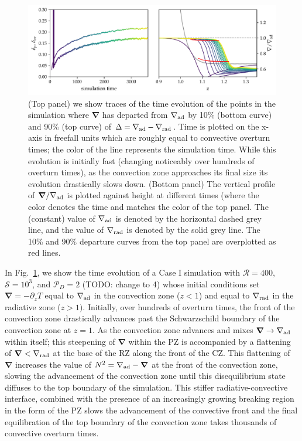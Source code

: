 \documentclass{aastex631}
\newcommand{\gradrad}{\ensuremath{\nabla_{\rm{rad}}}}
\newcommand{\gradad}{\ensuremath{\nabla_{\rm{ad}}}}
\newcommand{\mP}{\ensuremath{\mathcal{P}}}
\newcommand{\mR}{\ensuremath{\mathcal{R}}}
\newcommand{\mS}{\ensuremath{\mathcal{S}}}
\renewcommand{\vec}[1]{\boldsymbol{#1}}
\newcommand{\grad}{\vec{\nabla}}
\begin{document}
\begin{figure}[t!]
\centering
\includegraphics[width=\textwidth]{time_evolution.pdf}
\caption{(Top panel) we show traces of the time evolution of the points in the simulation where $\grad$ has departed from $\gradad$ by 10\% (bottom curve) and 90\% (top curve) of $\Delta = \gradad - \gradrad$.
Time is plotted on the x-axis in freefall units which are roughly equal to convective overturn times; the color of the line represents the simulation time.
While this evolution is initially fast (changing noticeably over hundreds of overturn times), as the convection zone approaches its final size its evolution drastically slows down.
(Bottom panel) The vertical profile of $\grad/\gradad$ is plotted against height at different times (where the color denotes the time and matches the color of the top panel.
The (constant) value of $\gradad$ is denoted by the horizontal dashed grey line, and the value of $\gradrad$ is denoted by the solid grey line.
The 10\% and 90\% departure curves from the top panel are overplotted as red lines.
\label{fig:time_evolution}
}
\end{figure}

In Fig.~\ref{fig:time_evolution}, we show the time evolution of a Case I simulation with $\mR = 400$, $\mS = 10^3$, and $\mP_D = 2$ (TODO: change to 4) whose initial conditions set $\grad = -\partial_z T$ equal to $\gradad$ in the convection zone ($z < 1$) and equal to $\gradrad$ in the radiative zone ($z > 1)$.
Initially, over hundreds of overturn times, the front of the convection zone drastically advances past the Schwarzschild boundary of the convection zone at $z = 1$.
As the convection zone advances and mixes $\grad \rightarrow \gradad$ within itself; this steepening of $\grad$ within the PZ is accompanied by a flattening of $\grad < \gradrad$ at the base of the RZ along the front of the CZ.
This flattening of $\grad$ increases the value of $N^2 = \gradad - \grad$ at the front of the convection zone, slowing the advancement of the convection zone until this disequilibrium state diffuses to the top boundary of the simulation.
This stiffer radiative-convective interface, combined with the presence of an increasingly growing breaking region in the form of the PZ slows the advancement of the convective front and the final equilibration of the top boundary of the convection zone takes thousands of convective overturn times.
\end{document}
